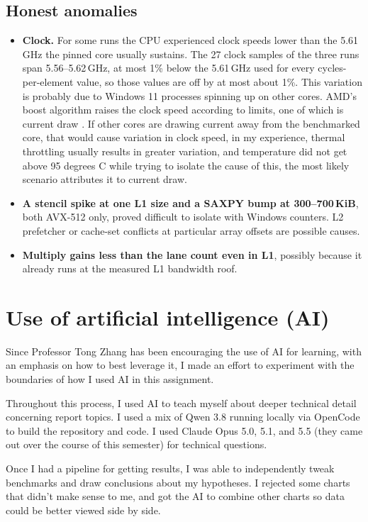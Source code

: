 \documentclass{article}
\begin{document}
\subsection{Honest anomalies}\label{sec:anomalies}
\begin{itemize}
  \item \textbf{Clock.} For some runs the CPU experienced clock speeds lower than the 5.61\,GHz the pinned core usually sustains. The 27 clock samples of the three runs span 5.56--5.62\,GHz, at most 1\% below the 5.61\,GHz used for every cycles-per-element value, so those values are off by at most about 1\%. This variation is probably due to Windows 11 processes spinning up on other cores. AMD's boost algorithm raises the clock speed according to limits, one of which is current draw \cite{amdpb2}. If other cores are drawing current away from the benchmarked core, that would cause variation in clock speed, in my experience, thermal throttling usually results in greater variation, and temperature did not get above 95 degrees C while trying to isolate the cause of this, the most likely scenario attributes it to current draw.
  \item \textbf{A stencil spike at one L1 size and a SAXPY bump at 300--700\,KiB}, both AVX-512 only, proved difficult to isolate with Windows counters. L2 prefetcher or cache-set conflicts at particular array offsets are possible causes.
  \item \textbf{Multiply gains less than the lane count even in L1}, possibly because it already runs at the measured L1 bandwidth roof.
\end{itemize}

\section{Use of artificial intelligence (AI)}\label{sec:aiuse}


Since Professor Tong Zhang has been encouraging the use of AI for learning, with an emphasis on how to best leverage it, I made an effort to experiment with the boundaries of how I used AI in this assignment.

 Throughout this process, I used AI to teach myself about deeper technical detail concerning report topics. I used a mix of Qwen 3.8 running locally via OpenCode to build the repository and code. I used Claude Opus 5.0, 5.1, and 5.5 (they came out over the course of this semester) for technical questions.

 Once I had a pipeline for getting results, I was able to independently tweak benchmarks and draw conclusions about my hypotheses. I rejected some charts that didn't make sense to me, and got the AI to combine other charts so data could be better viewed side by side.
\end{document}
